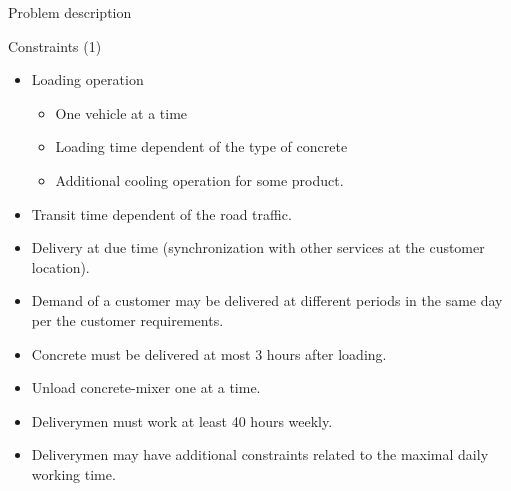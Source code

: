 \documentclass[9pt,xcolor={dvipsnames}]{beamer}
\begin{document}
\begin{frame}{Problem description}

\begin{block}{Constraints (1)}
\begin{itemize}
\item Loading operation
	\begin{itemize}
		\item One vehicle at a time
		\item Loading time dependent of the type of concrete
		\item Additional cooling operation for some product.
	\end{itemize}
\item Transit time dependent of the road traffic.

\item Delivery at due time (synchronization with other services at the customer location).

\item Demand of a customer may be delivered at different periods in the same day per the customer requirements.

\item  Concrete must be delivered at most 3 hours after loading.

\item Unload concrete-mixer one at a time.

\item Deliverymen must work at least 40 hours weekly.

\item Deliverymen may have additional constraints related to the maximal daily working time.


\end{itemize}
\end{block}


\end{frame}
\end{document}
